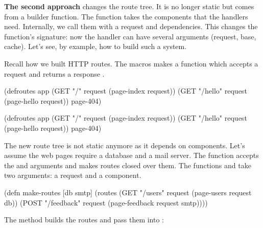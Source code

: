 \textbf{The second approach} changes the route tree. It is no longer static but comes from a builder function. The function takes the components that the handlers need. Internally, we call them with a request and dependencies. This changes the function's signature: now the handler can have several arguments (request, base, cache). Let's see, by example, how to build such a system.


Recall how we built HTTP routes. The macros  makes a function which accepts a request and returns a response .

\ifnarrow

\begin{english}
  \begin{clojure}
(defroutes app
  (GET "/"
    request (page-index request))
  (GET "/hello"
    request (page-hello request))
  page-404)
  \end{clojure}
\end{english}

\else

\begin{english}
  \begin{clojure}
(defroutes app
  (GET "/"      request (page-index request))
  (GET "/hello" request (page-hello request))
  page-404)
  \end{clojure}
\end{english}

\fi

The new route tree is not static anymore as it depends on components. Let's assume the web pages require a database and a mail server. The function  accepts the  and  arguments and makes routes closed over them. The functions  and  take two arguments: a request and a component.

\begin{english}
  \begin{clojure}
(defn make-routes [db smtp]
  (routes
   (GET "/users" request
      (page-users request db))
   (POST "/feedback" request
      (page-feedback request smtp))))
  \end{clojure}
\end{english}

\noindent
The  method builds the routes and pass them into :

\ifnarrow

